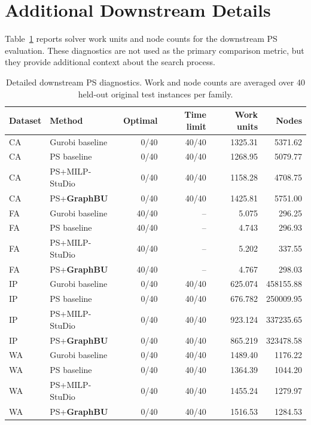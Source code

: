 \documentclass[letterpaper]{article}
\newcommand{\method}{\textbf{GraphBU}\xspace}
\begin{document}
\section{Additional Downstream Details}

Table~\ref{tab:app_ps_detail} reports solver work units and node counts
for the downstream PS evaluation. These diagnostics are not used as the
primary comparison metric, but they provide additional context about the
search process.

\begin{table}[!t]
\centering
\small
\setlength{\tabcolsep}{5pt}
\renewcommand{\arraystretch}{0.98}
\caption{Detailed downstream PS diagnostics. Work and node counts are averaged over 40 held-out original test instances per family.}
\label{tab:app_ps_detail}
\begin{tabular}{@{}llrrrr@{}}
\toprule
\textbf{Dataset} & \textbf{Method} & \textbf{Optimal} & \textbf{Time limit} & \textbf{Work units} & \textbf{Nodes} \\
\midrule
CA & Gurobi baseline & 0/40 & 40/40 & 1325.31 & 5371.62 \\
CA & PS baseline & 0/40 & 40/40 & 1268.95 & 5079.77 \\
CA & PS+MILP-StuDio & 0/40 & 40/40 & 1158.28 & 4708.75 \\
CA & PS+\method & 0/40 & 40/40 & 1425.81 & 5751.00 \\
\midrule
FA & Gurobi baseline & 40/40 & -- & 5.075 & 296.25 \\
FA & PS baseline & 40/40 & -- & 4.743 & 296.93 \\
FA & PS+MILP-StuDio & 40/40 & -- & 5.202 & 337.55 \\
FA & PS+\method & 40/40 & -- & 4.767 & 298.03 \\
\midrule
IP & Gurobi baseline & 0/40 & 40/40 & 625.074 & 458155.88 \\
IP & PS baseline & 0/40 & 40/40 & 676.782 & 250009.95 \\
IP & PS+MILP-StuDio & 0/40 & 40/40 & 923.124 & 337235.65 \\
IP & PS+\method & 0/40 & 40/40 & 865.219 & 323478.58 \\
\midrule
WA & Gurobi baseline & 0/40 & 40/40 & 1489.40 & 1176.22 \\
WA & PS baseline & 0/40 & 40/40 & 1364.39 & 1044.20 \\
WA & PS+MILP-StuDio & 0/40 & 40/40 & 1455.24 & 1279.97 \\
WA & PS+\method & 0/40 & 40/40 & 1516.53 & 1284.53 \\
\bottomrule
\end{tabular}


\end{table}
\end{document}

